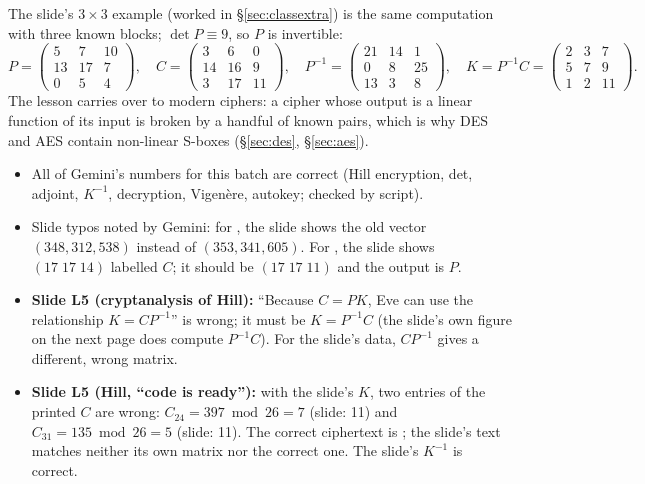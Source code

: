 The slide's $3\times3$ example (worked in \S\ref{sec:classextra}) is the same computation with three known blocks; $\det P \equiv 9$, so $P$ is invertible:
\[
P = \begin{pmatrix}5&7&10\\13&17&7\\0&5&4\end{pmatrix},\quad
C = \begin{pmatrix}3&6&0\\14&16&9\\3&17&11\end{pmatrix},\quad
P^{-1} = \begin{pmatrix}21&14&1\\0&8&25\\13&3&8\end{pmatrix},\quad
K = P^{-1}C = \begin{pmatrix}2&3&7\\5&7&9\\1&2&11\end{pmatrix}.
\]
The lesson carries over to modern ciphers: a cipher whose output is a linear function of its input is broken by a handful of known pairs, which is why DES and AES contain non-linear S-boxes (\S\ref{sec:des}, \S\ref{sec:aes}).

\begin{fixbox}
\begin{itemize}
  \item All of Gemini's numbers for this batch are correct (Hill encryption, det, adjoint, $K^{-1}$, decryption, Vigen\`ere, autokey; checked by script).
  \item Slide typos noted by Gemini: for , the slide shows the old vector $(348, 312, 538)$ instead of $(353, 341, 605)$. For , the slide shows $(17\;17\;14)$ labelled $C$; it should be $(17\;17\;11)$ and the output is $P$.
  \item \textbf{Slide L5 (cryptanalysis of Hill):} ``Because $C = PK$, Eve can use the relationship $K = CP^{-1}$'' is wrong; it must be $K = P^{-1}C$ (the slide's own figure on the next page does compute $P^{-1}C$). For the slide's data, $CP^{-1}$ gives a different, wrong matrix.
  \item \textbf{Slide L5 (Hill, ``code is ready''):} with the slide's $K$, two entries of the printed $C$ are wrong: $C_{24} = 397 \bmod 26 = 7$ (slide: 11) and $C_{31} = 135 \bmod 26 = 5$ (slide: 11). The correct ciphertext is ; the slide's text  matches neither its own matrix nor the correct one. The slide's $K^{-1}$ is correct.
\end{itemize}
\end{fixbox}

